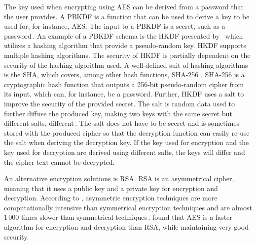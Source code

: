 The key used when encrypting using \gls{AES} can be derived from a password that the user provides. A \gls{PBKDF} is a function that can be used to derive a key to be used for, for instance, \gls{AES}. The input to a \gls{PBKDF} is a secret, such as a password\,\cite{kodwaniSecurityKeyDerivation2021}. An example of a \gls{PBKDF} schema is the \gls{HKDF} presented by \citeauthor{krawczykCryptographicExtractionKey2010}\,\cite{krawczykCryptographicExtractionKey2010, krawczykHMACbasedExtractandExpandKey2010} which utilizes a hashing algorithm that provide a \mbox{pseudo-random} key. \gls{HKDF} supports multiple hashing algorithms. The security of \gls{HKDF} is partially dependent on the security of the hashing algorithm used. A \mbox{well-defined} suit of hashing algorithms is the \gls{SHA}, which covers, among other hash functions, \mbox{\gls{SHA}-256} \cite{hansenUSSecureHash2011}. \mbox{\gls{SHA}-256} is a cryptographic hash function that outputs a \mbox{256-bit} \mbox{pseudo-random} cipher from its input, which can, for instance, be a password. Further, \gls{HKDF} uses a salt to improve the security of the provided secret. The salt is random data used to further diffuse the produced key, making two keys with the same secret but different salts, different\,\cite{ariasAddingSaltHashing2021}. The salt does not have to be secret and is sometimes stored with the produced cipher so that the decryption function can easily \mbox{re-use} the salt when deriving the decryption key. If the key used for encryption and the key used for decryption are derived using different salts, the keys will differ and the cipher text cannot be decrypted.

An alternative encryption solutions is \gls{RSA}. \gls{RSA} is an asymmetrical cipher, meaning that it uses a public key and a private key for encryption and decryption. According to \citeauthor{mahajanStudyEncryptionAlgorithms2013}, asymmetric encryption techniques are more computationally intensive than symmetrical encryption techniques and are almost 1\,000 times slower than symmetrical techniques\,\cite{mahajanStudyEncryptionAlgorithms2013}. \citeauthor{mahajanStudyEncryptionAlgorithms2013} found that \gls{AES} is a faster algorithm for encryption and decryption than \gls{RSA}, while maintaining very good security.